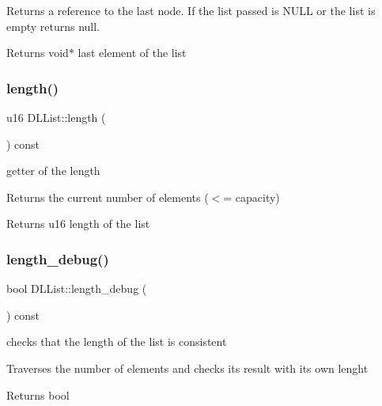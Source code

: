 Returns a reference to the last node. If the list passed is N\+U\+LL or the list is empty returns null.

\begin{DoxyReturn}{Returns}
void$\ast$ last element of the list 
\end{DoxyReturn}
\mbox{\label{class_d_l_list_a13e8782dda500ed2ef042793139cd244}} 
\subsubsection{\texorpdfstring{length()}{length()}}
{\footnotesize\ttfamily u16 D\+L\+List\+::length (\begin{DoxyParamCaption}{ }\end{DoxyParamCaption}) const}



getter of the length 

Returns the current number of elements ($<$= capacity)

\begin{DoxyReturn}{Returns}
u16 length of the list 
\end{DoxyReturn}
\mbox{\label{class_d_l_list_abd76bf71a8021ef4be9f76a32cc679a8}} 
\subsubsection{\texorpdfstring{length\+\_\+debug()}{length\_debug()}}
{\footnotesize\ttfamily bool D\+L\+List\+::length\+\_\+debug (\begin{DoxyParamCaption}{ }\end{DoxyParamCaption}) const}



checks that the length of the list is consistent 

Traverses the number of elements and checks its result with its own lenght

\begin{DoxyReturn}{Returns}
bool 
\end{DoxyReturn}
\mbox{\label{class_d_l_list_aea04194eeedf39bc0682cf459f39f26b}} 
